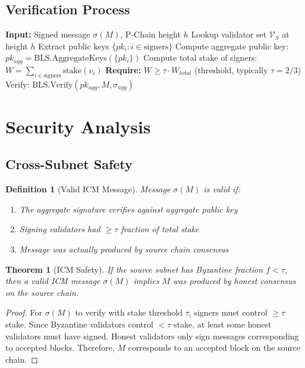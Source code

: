 \documentclass[11pt,a4paper]{article}
\newtheorem{theorem}{Theorem}
\newtheorem{definition}{Definition}
\begin{document}
\subsection{Verification Process}

\begin{algorithm}
\caption{ICM Message Verification at Destination}
\begin{algorithmic}[1]
\STATE \textbf{Input:} Signed message $\sigma(M)$, P-Chain height $h$
\STATE Lookup validator set $\mathcal{V}_S$ at height $h$
\STATE Extract public keys $\{pk_i : i \in \text{signers}\}$
\STATE Compute aggregate public key:
    \STATE \quad $pk_{agg} = \text{BLS.AggregateKeys}(\{pk_i\})$
\STATE Compute total stake of signers:
    \STATE \quad $W = \sum_{i \in \text{signers}} \text{stake}(v_i)$
\STATE \textbf{Require:} $W \geq \tau \cdot W_{total}$ (threshold, typically $\tau = 2/3$)
\STATE Verify: $\text{BLS.Verify}(pk_{agg}, M, \sigma_{agg})$
\end{algorithmic}
\end{algorithm}

\section{Security Analysis}

\subsection{Cross-Subnet Safety}

\begin{definition}[Valid ICM Message]
Message $\sigma(M)$ is valid if:
\begin{enumerate}
    \item The aggregate signature verifies against aggregate public key
    \item Signing validators had $\geq \tau$ fraction of total stake
    \item Message was actually produced by source chain consensus
\end{enumerate}
\end{definition}

\begin{theorem}[ICM Safety]
\label{thm:icm-safety}
If the source subnet has Byzantine fraction $f < \tau$, then a valid ICM message $\sigma(M)$ implies $M$ was produced by honest consensus on the source chain.
\end{theorem}

\begin{proof}
For $\sigma(M)$ to verify with stake threshold $\tau$, signers must control $\geq \tau$ stake. Since Byzantine validators control $< \tau$ stake, at least some honest validators must have signed. Honest validators only sign messages corresponding to accepted blocks. Therefore, $M$ corresponds to an accepted block on the source chain.
\end{proof}
\end{document}
